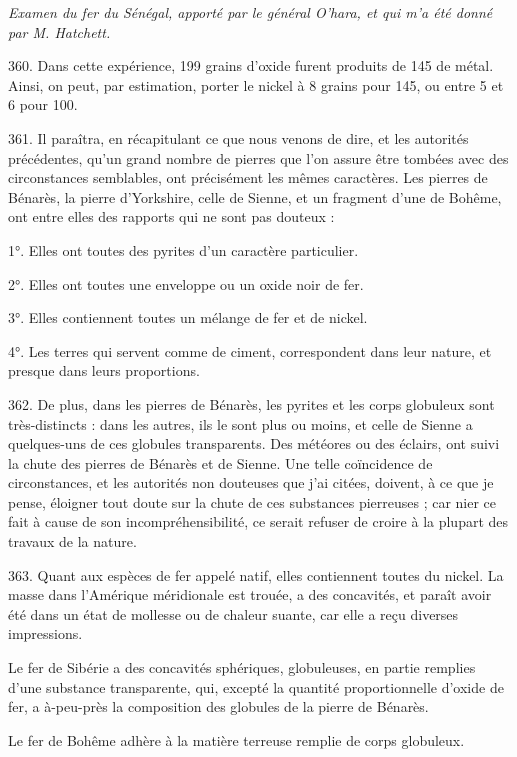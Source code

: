 \documentclass[a4paper, 11pt, oneside, polutonikogreek, french]{article}
\begin{document}
\begin{center}
\emph{Examen du fer du Sénégal, apporté par le général O'hara, et qui m'a été donné par M. Hatchett.}
\end{center}

360. Dans cette expérience, 199 grains d'oxide furent produits de 145 de métal. Ainsi, on peut, par estimation, porter le nickel à 8 grains pour 145, ou entre 5 et 6 pour 100.

361. Il paraîtra, en récapitulant ce que nous venons de dire, et les autorités précédentes, qu'un grand nombre de pierres que l'on assure être tombées avec des circonstances semblables, ont précisément les mêmes caractères. Les pierres de Bénarès, la pierre d'Yorkshire, celle de Sienne, et un fragment d'une de Bohême, ont entre elles des rapports qui ne sont pas douteux :

1°. Elles ont toutes des pyrites d'un caractère particulier.

2°. Elles ont toutes une enveloppe ou un oxide noir de fer.

3°. Elles contiennent toutes un mélange de fer et de nickel.

4°. Les terres qui servent comme de ciment, correspondent dans leur nature, et presque dans leurs proportions.

362. De plus, dans les pierres de Bénarès, les pyrites et les corps globuleux sont très-distincts : dans les autres, ils le sont plus ou moins, et celle de Sienne a quelques-uns de ces globules transparents. Des météores ou des éclairs, ont suivi la chute des pierres de Bénarès et de Sienne. Une telle coïncidence de circonstances, et les autorités non douteuses que j'ai citées, doivent, à ce que je pense, éloigner tout doute sur la chute de ces substances pierreuses ; car nier ce fait à cause de son incompréhensibilité, ce serait refuser de croire à la plupart des travaux de la nature.

363. Quant aux espèces de fer appelé natif, elles contiennent toutes du nickel. La masse dans l'Amérique méridionale est trouée, a des concavités, et paraît avoir été dans un état de mollesse ou de chaleur suante, car elle a reçu diverses impressions.

Le fer de Sibérie a des concavités sphériques, globuleuses, en partie remplies d'une substance transparente, qui, excepté la quantité proportionnelle d'oxide de fer, a à-peu-près la composition des globules de la pierre de Bénarès.

Le fer de Bohême adhère à la matière terreuse remplie de corps globuleux.
\end{document}
